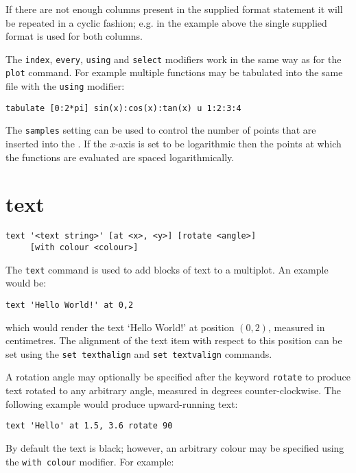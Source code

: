 If there are not enough columns present in the supplied format statement it
will be repeated in a cyclic fashion; e.g. in the example above the single
supplied format is used for both columns.

The {\tt index}, {\tt every}, {\tt using} and {\tt select} modifiers work in the
same way as for the {\tt plot} command.  For example multiple functions may be
tabulated into the same file with the {\tt using} modifier:

\begin{verbatim}
tabulate [0:2*pi] sin(x):cos(x):tan(x) u 1:2:3:4
\end{verbatim}

The {\tt samples} setting can be used to control the number of points that are
inserted into the \datafile.  If the $x$-axis is set to be logarithmic then the
points at which the functions are evaluated are spaced logarithmically.

\section{text}

\begin{verbatim}
text '<text string>' [at <x>, <y>] [rotate <angle>]
     [with colour <colour>]
\end{verbatim}

The {\tt text} command is used to add blocks of text to a multiplot. An example
would be:

\begin{verbatim}
text 'Hello World!' at 0,2
\end{verbatim}

\noindent which would render the text `Hello World!' at position $(0,2)$,
measured in centimetres. The alignment of the text item with respect to this
position can be set using the {\tt set texthalign} and {\tt set textvalign}
commands.

A rotation angle may optionally be specified after the keyword {\tt rotate}
to produce text rotated to any arbitrary angle, measured in degrees
counter-clockwise. The following example would produce upward-running text:

\begin{verbatim}
text 'Hello' at 1.5, 3.6 rotate 90
\end{verbatim}

By default the text is black; however, an arbitrary colour may be specified
using the {\tt with colour} modifier.  For example:


